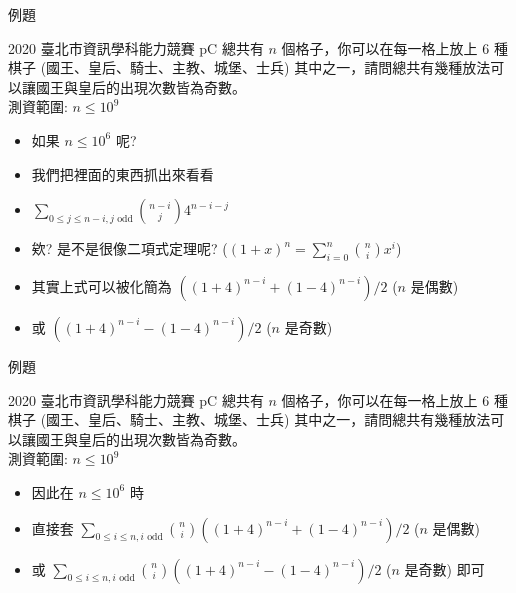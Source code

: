 \documentclass[aspectratio=169]{beamer}
\begin{document}
\begin{frame}{例題}
    \begin{block}{2020 臺北市資訊學科能力競賽 pC}
        總共有 $n$ 個格子，你可以在每一格上放上 $6$ 種棋子 (國王、皇后、騎士、主教、城堡、士兵) 其中之一，請問總共有幾種放法可以讓國王與皇后的出現次數皆為奇數。\\
        \vspace{5mm}
        測資範圍: $n \le 10^9$
    \end{block} 
    \begin{itemize}
        \item<1-> 如果 $n \le 10^6$ 呢?
        \item<2-> 我們把裡面的東西抓出來看看
        \item<2-> $\displaystyle \sum_{0 \le j \le n-i, j \text{ odd}} \binom{n-i}{j} 4^{n-i-j}$
        \item<3-> 欸? 是不是很像二項式定理呢? ($(1+x)^n = \sum_{i=0}^n \binom{n}{i} x^i$)
        \item<4-> 其實上式可以被化簡為 $((1+4)^{n-i} + (1-4)^{n-i})/2$ ($n$ 是偶數) 
        \item<4-> 或 $((1+4)^{n-i} - (1-4)^{n-i})/2$ ($n$ 是奇數)
    \end{itemize}
\end{frame}

\begin{frame}{例題}
    \begin{block}{2020 臺北市資訊學科能力競賽 pC}
        總共有 $n$ 個格子，你可以在每一格上放上 $6$ 種棋子 (國王、皇后、騎士、主教、城堡、士兵) 其中之一，請問總共有幾種放法可以讓國王與皇后的出現次數皆為奇數。\\
        \vspace{5mm}
        測資範圍: $n \le 10^9$
    \end{block} 
    \begin{itemize}
        \item 因此在 $n \le 10^6$ 時
        \item 直接套 $\displaystyle \sum_{0 \le i \le n, i \text{ odd}} \binom{n}{i} ((1+4)^{n-i} + (1-4)^{n-i})/2$ ($n$ 是偶數) 
        \item 或 $\displaystyle \sum_{0 \le i \le n, i \text{ odd}} \binom{n}{i} ((1+4)^{n-i} - (1-4)^{n-i})/2$ ($n$ 是奇數) 即可
    \end{itemize}
\end{frame}
\end{document}
